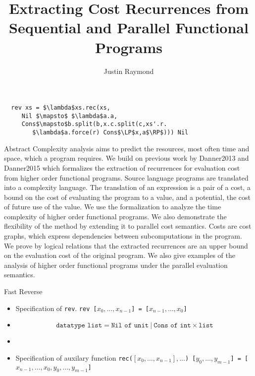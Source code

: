 \documentclass[pdf]{beamer}
\title{Extracting Cost Recurrences from Sequential and Parallel Functional Programs}
\author{Justin Raymond}
\newcommand{\T}[1]{\texttt{#1}}
\newcommand{\LP}{\langle}
\newcommand{\RP}{\rangle}
\begin{document}
\begin{lrbox}{\codebox}
  \begin{lstlisting}
  rev xs = $\lambda$xs.rec(xs,
     Nil $\mapsto$ $\lambda$a.a,
     Cons$\mapsto$b.split(b,x.c.split(c,xs'.r.
        $\lambda$a.force(r) Cons$\LP$x,a$\RP$))) Nil
  \end{lstlisting}
\end{lrbox}

\begin{frame}
  \titlepage
\end{frame}

\begin{frame}{Abstract}
Complexity analysis aims to predict the resources, most often time and space,
which a program requires.  We build on previous work by Danner2013 and
Danner2015 which formalizes the extraction of recurrences for evaluation
cost from higher order functional programs. Source language programs are
translated into a complexity language. The translation of an expression is a
pair of a cost, a bound on the cost of evaluating the program to a value, and a
potential, the cost of future use of the value. We use the formalization to
analyze the time complexity of higher order functional programs. We also
demonstrate the flexibility of the method by extending it to parallel cost
semantics. Costs are cost graphs, which express dependencies between
subcomputations in the program. We prove by logical relations that the
extracted recurrences are an upper bound on the evaluation cost of the original
program. We also give examples of the analysis of higher order functional
programs under the parallel evaluation semantics.
\end{frame}


\begin{frame}{Fast Reverse}
  \begin{itemize}
    \item<2->
      Specification of \T{rev}.
      \T{rev [$x_0,\dots,x_{n-1}$] = [$x_{n-1},\dots,x_0$]}
    \item<3->
      \[
        \T{datatype list} = \T{Nil of unit}\ |\ \T{Cons of int} \times \T{list}
      \]
    \item<4->
      \usebox{\codebox}
    \item<5->
      Specification of auxilary function
      \T{rec($[x_0,\dots,x_{n-1}],\dots$) [$y_0,\dots,y_{m-1}$] = [$x_{n-1},\dots,x_0,y_0,\dots,y_{m-1}$]}
  \end{itemize}
\end{frame}
\end{document}
